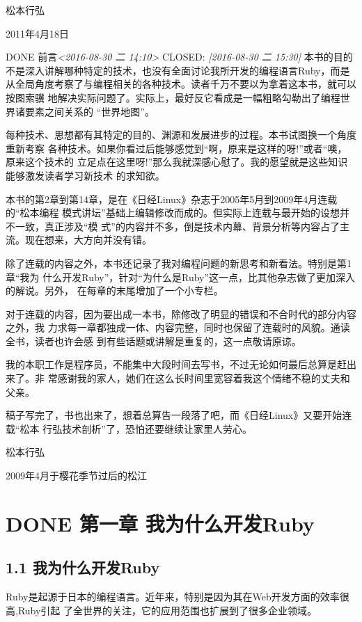 \documentclass[11pt]{ctexart}
\begin{document}
松本行弘

2011年4月18日
\newpage

DONE 前言\textit{<2016-08-30 二 14:10>}
 CLOSED: \textit{[2016-08-30 二 15:30]}
本书的目的不是深入讲解哪种特定的技术，也没有全面讨论我所开发的编程语言Ruby，而是
从全局角度考察了与编程相关的各种技术。读者千万不要以为拿着这本书，就可以按图索骥
地解决实际问题了。实际上，最好反它看成是一幅粗略勾勒出了编程世界诸要素之间关系的
“世界地图”。

每种技术、思想都有其特定的目的、渊源和发展进步的过程。本书试图换一个角度重新考察
各种技术。如果你看过后能够感觉到“啊，原来是这样的呀!”或者“噢，原来这个技术的
立足点在这里呀!”那么我就深感心慰了。我的愿望就是这些知识能够激发读者学习新技术
的求知欲。

本书的第2章到第14章，是在《日经Linux》杂志于2005年5月到2009年4月连载的“松本编程
模式讲坛”基础上编辑修改而成的。但实际上连载与最开始的设想并不一致，真正涉及“模
式”的内容并不多，倒是技术内幕、背景分析等内容占了主流。现在想来，大方向并没有错。

除了连载的内容之外，本书还记录了我对编程问题的新思考和新看法。特别是第1章“我为
什么开发Ruby”，针对“为什么是Ruby”这一点，比其他杂志做了更加深入的解说。另外，
在每章的末尾增加了一个小专栏。

对于连载的内容，因为要出成一本书，除修改了明显的错误和不合时代的部分内容之外，我
力求每一章都独成一体、内容完整，同时也保留了连载时的风貌。通读全书，读者也许会感
到有些话题或讲解是重复的，这一点敬请原谅。

我的本职工作是程序员，不能集中大段时间去写书，不过无论如何最后总算是赶出来了。非
常感谢我的家人，她们在这么长时间里宽容着我这个情绪不稳的丈夫和父亲。

稿子写完了，书也出来了，想着总算告一段落了吧，而《日经Linux》又要开始连载“松本
行弘技术剖析”了，恐怕还要继续让家里人劳心。

松本行弘

2009年4月于樱花季节过后的松江


\section{{\bfseries\sffamily DONE} 第一章 我为什么开发Ruby}
\label{sec:orgheadline8}
\subsection{1.1 我为什么开发Ruby}
\label{sec:orgheadline7}

Ruby是起源于日本的编程语言。近年来，特别是因为其在Web开发方面的效率很高,Ruby引起
了全世界的关注，它的应用范围也扩展到了很多企业领域。
\end{document}
